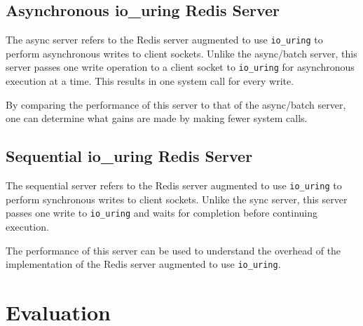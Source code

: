 \documentclass[sigconf]{acmart}
\newcommand{\inlinecode}[1]{\texttt{#1}}
\begin{document}
\subsection{Asynchronous io\_uring Redis Server}
The async server refers to the Redis server augmented to use \inlinecode{io\_uring} to perform asynchronous writes to client sockets.
Unlike the async/batch server, this server passes one write operation to a client socket to \inlinecode{io\_uring} for asynchronous execution at a time.
This results in one system call for every write.

By comparing the performance of this server to that of the async/batch server, one can determine what gains are made by making fewer system calls.

\subsection{Sequential io\_uring Redis Server}
The sequential server refers to the Redis server augmented to use \inlinecode{io\_uring} to perform synchronous writes to client sockets.
Unlike the sync server, this server passes one write to \inlinecode{io\_uring} and waits for completion before continuing execution.

The performance of this server can be used to understand the overhead of the implementation of the Redis server augmented to use \inlinecode{io\_uring}.

\section{Evaluation}
\end{document}
